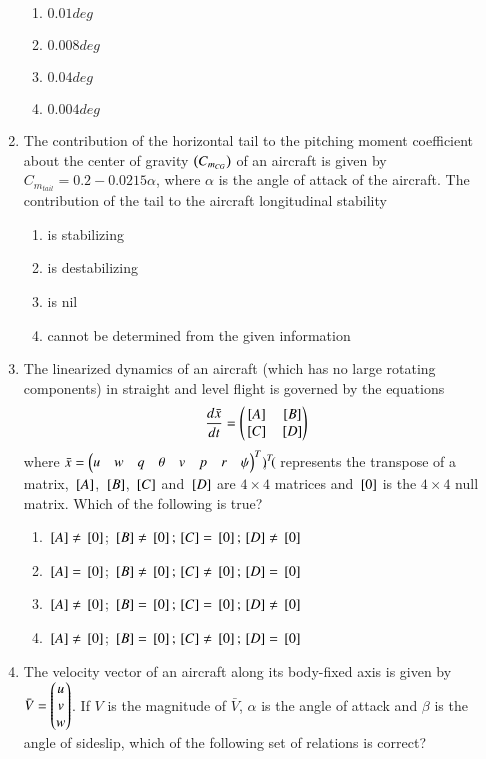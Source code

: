 \documentclass[journal]{IEEEtran}
\begin{document}
\begin{enumerate}
		\begin{enumerate}
			\item $0.01 deg$
			\item $0.008 deg$
			\item $0.04 deg$
			\item $0.004 deg$
		\end{enumerate}
	\item 
	The contribution of the horizontal tail to the pitching moment coefficient about the center of gravity $\left(C_{m_{CG}}\right)$ of an aircraft is given by $C_{m_{tail}} = 0.2 - 0.0215\alpha$, where $\alpha$ is the angle of attack of the aircraft. The contribution of the tail to the aircraft longitudinal stability
		\begin{enumerate}
			\item is stabilizing
			\item is destabilizing
			\item is nil
			\item cannot be determined from the given information
		\end{enumerate}
	\item
	The linearized dynamics of an aircraft (which has no large rotating components) in straight and level flight is governed by the equations
	\begin{align}
		\frac{d\bar{x}}{dt} &= \begin{pmatrix}{}\left[A\right] & {}\left[B\right] \\ {}\left[C\right] & {}\left[D\right]\end{pmatrix}
	\end{align}
	where $\bar{x} = \begin{pmatrix}u & w & q & \theta & v & p & r & \psi\end{pmatrix}^{T}$, $\begin{pmatrix}\end{pmatrix}^{T}$ represents the transpose of a matrix, ${}\left[A\right]$, ${}\left[B\right]$, ${}\left[C\right]$ and ${}\left[D\right]$ are $4 \times 4$ matrices and ${}\left[0\right]$ is the $4 \times 4$ null matrix. Which of the following is true?
		\begin{enumerate}
			\item ${}\left[A\right] \neq {}\left[0\right]$; ${}\left[B\right] \neq {}\left[0\right]; {}\left[C\right] = {}\left[0\right]; {}\left[D\right] \neq {}\left[0\right]$
			\item ${}\left[A\right] = {}\left[0\right]$; ${}\left[B\right] \neq {}\left[0\right]; {}\left[C\right] \neq {}\left[0\right]; {}\left[D\right] = {}\left[0\right]$
			\item ${}\left[A\right] \neq {}\left[0\right]$; ${}\left[B\right] = {}\left[0\right]; {}\left[C\right] = {}\left[0\right]; {}\left[D\right] \neq {}\left[0\right]$
			\item ${}\left[A\right] \neq {}\left[0\right]$; ${}\left[B\right] = {}\left[0\right]; {}\left[C\right] \neq {}\left[0\right]; {}\left[D\right] = {}\left[0\right]$
		\end{enumerate}
	\item
	The velocity vector of an aircraft along its body-fixed axis is given by $\bar{V} = \begin{pmatrix}u \\ v \\ w\end{pmatrix}$. If $V$ is the magnitude of $\bar{V}$, $\alpha$ is the angle of attack and $\beta$ is the angle of sideslip, which of the following set of relations is correct?

\end{enumerate}
\end{document}
